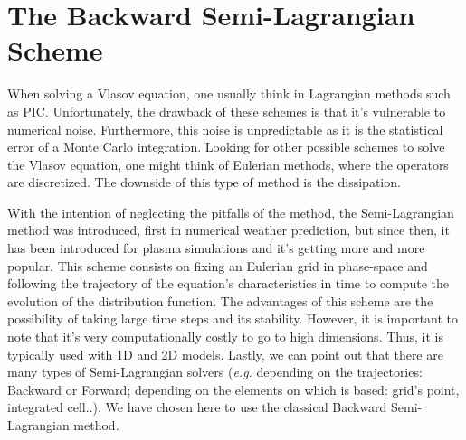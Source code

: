 \documentclass[proc]{edpsmath}
\begin{document}


\section{The Backward Semi-Lagrangian Scheme}
\label{sec:BSL_scheme}

When solving a Vlasov equation, one usually think in Lagrangian methods such as PIC. Unfortunately, the drawback of these schemes is that it's vulnerable to numerical noise. Furthermore, this noise is unpredictable as it is the statistical error of a Monte Carlo integration. Looking for other possible schemes to solve the Vlasov equation, one might think of Eulerian methods, where the operators 
are discretized. The downside of this type of method is the dissipation.

With the intention of neglecting the pitfalls of the method, the Semi-Lagrangian method was introduced, first in numerical weather prediction, but since then, it has been introduced for plasma simulations \cite{sonnendrucker:inria-00073296, Cheng1976330} and it's getting more and more popular. This scheme consists on fixing an Eulerian grid in phase-space and following the trajectory of the equation's characteristics in time to compute the evolution of the distribution function. The advantages of this scheme are the possibility of taking large time steps and its stability. However, it is important to note that it's very computationally costly to go to high dimensions. Thus, it is typically used with 1D and 2D models. Lastly, we can point out that there are many types of Semi-Lagrangian solvers (\emph{e.g.} depending on the trajectories: Backward or Forward;  depending on the elements on which is based: grid's point, integrated cell..). We have chosen here to use the classical Backward Semi-Lagrangian method. 
\end{document}
